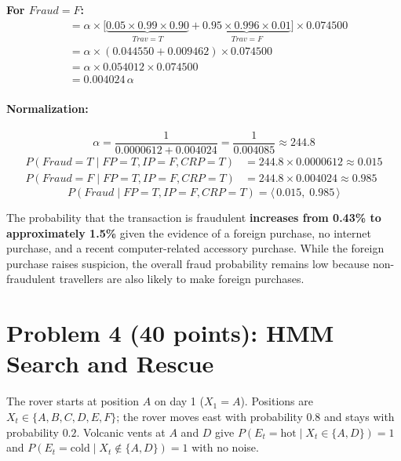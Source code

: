 \documentclass[12pt]{article}
\begin{document}
\textbf{For $\textit{Fraud}=F$:}
\begin{align*}
&=\alpha\times\bigl[\underbrace{0.05\times0.99\times0.90}_{\textit{Trav}=T}
  +\underbrace{0.95\times0.996\times0.01}_{\textit{Trav}=F}\bigr]
  \times0.074500\\
&=\alpha\times(0.044550+0.009462)\times0.074500\\
&=\alpha\times0.054012\times0.074500\\
&=0.004024\,\alpha
\end{align*}

\paragraph{Normalization:}
\[
\alpha=\frac{1}{0.0000612+0.004024}=\frac{1}{0.004085}\approx244.8
\]
\begin{align*}
P(\textit{Fraud}{=}T\mid\textit{FP}{=}T,\textit{IP}{=}F,\textit{CRP}{=}T)
  &=244.8\times0.0000612\approx0.015\\
P(\textit{Fraud}{=}F\mid\textit{FP}{=}T,\textit{IP}{=}F,\textit{CRP}{=}T)
  &=244.8\times0.004024\approx0.985
\end{align*}
\[
\boxed{P(\textit{Fraud}\mid\textit{FP}{=}T,\textit{IP}{=}F,\textit{CRP}{=}T)
=\langle\,0.015,\;0.985\,\rangle}
\]

The probability that the transaction is fraudulent \textbf{increases from 0.43\% to approximately
1.5\%} given the evidence of a foreign purchase, no internet purchase, and a recent
computer-related accessory purchase. While the foreign purchase raises suspicion, the
overall fraud probability remains low because non-fraudulent travellers are also likely
to make foreign purchases.

\newpage
\section{Problem 4 (40 points): HMM Search and Rescue}

The rover starts at position $A$ on day 1 ($X_1=A$). Positions are
$X_t\in\{A,B,C,D,E,F\}$; the rover moves east with probability $0.8$ and
stays with probability $0.2$. Volcanic vents at $A$ and $D$ give
$P(E_t{=}\text{hot}\mid X_t\in\{A,D\})=1$ and
$P(E_t{=}\text{cold}\mid X_t\notin\{A,D\})=1$ with no noise.

\begin{center}
\end{center}
\end{document}
